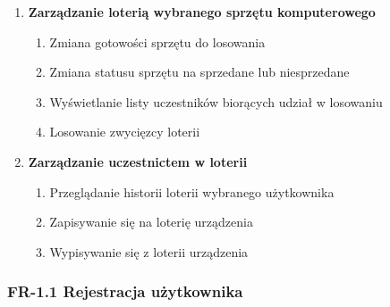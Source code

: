\begin{enumerate}[label={\textbf{FR}-\bfseries\arabic*}]
		
		\item \textbf{Zarządzanie loterią wybranego sprzętu komputerowego}
		\begin{enumerate}[label={FR-\arabic{enumi}.\arabic*}]
        \item Zmiana gotowości sprzętu do losowania
        \item Zmiana statusu sprzętu na sprzedane lub niesprzedane
				\item Wyświetlanie listy uczestników biorących udział w losowaniu
        \item Losowanie zwycięzcy loterii
    \end{enumerate}
		
		\item \textbf{Zarządzanie uczestnictem w loterii}
			\begin{enumerate}[label={FR-\arabic{enumi}.\arabic*}]
        \item Przeglądanie historii loterii wybranego użytkownika
        \item Zapisywanie się na loterię urządzenia
				\item Wypisywanie się z loterii urządzenia
    \end{enumerate}
		
		
		
\end{enumerate}

\newcommand\addrow[2]{#1 & #2\\ \hline}

\newcommand\additemizedrow[2]{#1 &
        \begin{tabenum}
            #2
        \end{tabenum}
        \\ \hline}

\newcommand\name[1]{\addrow{Nazwa}{#1}}
\newcommand\actor[1]{\addrow{Aktor}{#1}}
\newcommand\udescription[1]{\addrow{Opis}{#1}}
\newcommand\precondition[1]{\addrow{Warunki wstępne}{#1}}
\newcommand\scenario[1]{\additemizedrow{Scenariusz}{#1}}
\newcommand\alternateScenario[1]{\additemizedrow{Alternatywny}{#1}}
\newcommand\extend[1]{\additemizedrow{Extend}{#1}}
\newcommand\includee[1]{\additemizedrow{Include}{#1}}

\newenvironment{usecase}{\tabularx{\textwidth}{|0{wl{3cm}}|0{X}|}\hline}{\endtabularx}
\setlength{\parindent}{0em}
\setlength{\parskip}{1em}


\subsubsection{FR-1.1 Rejestracja użytkownika}

